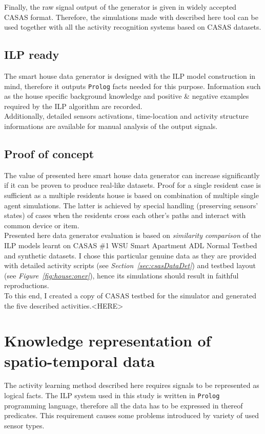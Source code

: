 \documentclass[10pt, a4paper, pdflatex, leqno, twoside, openright]{report}
\begin{document}
Finally, the raw signal output of the generator is given in widely accepted CASAS format. Therefore, the simulations made with described here tool can be used together with all the activity recognition systems based on CASAS datasets.

    \subsection{ILP ready}
The smart house data generator is designed with the ILP model construction in mind, therefore it outputs \texttt{Prolog} facts needed for this purpose. Information such as the house specific background knowledge and positive \& negative examples required by the ILP algorithm are recorded.\\
Additionally, detailed sensors activations, time-location and activity structure informations are available for manual analysis of the output signals.

    \subsection{Proof of concept}
The value of presented here smart house data generator can increase significantly if it can be proven to produce real-like datasets. Proof for a single resident case is sufficient as a multiple residents house is based on combination of multiple single agent simulations. The latter is achieved by special handling (preserving sensors' states) of cases when the residents cross each other's paths and interact with common device or item.\\

Presented here data generator evaluation is based on \emph{similarity comparison} of the ILP models learnt on CASAS \#1 WSU Smart Apartment ADL Normal Testbed and synthetic datasets. I chose this particular genuine data as they are provided with detailed activity scripts (see \emph{Section~\ref{sec:csasDataDet}}) and testbed layout (see \emph{Figure~\ref{fig:house:oner}}), hence its simulations should result in faithful reproductions.\\

To this end, I created a copy of CASAS testbed for the simulator and generated the five described activities.<HERE>

  \section{Knowledge representation of spatio-temporal data}
The activity learning method described here requires signals to be represented as logical facts. The ILP system used in this study is written in \texttt{Prolog} programming language, therefore all the data has to be expressed in thereof predicates. This requirement causes some problems introduced by variety of used sensor types.\\
\end{document}
